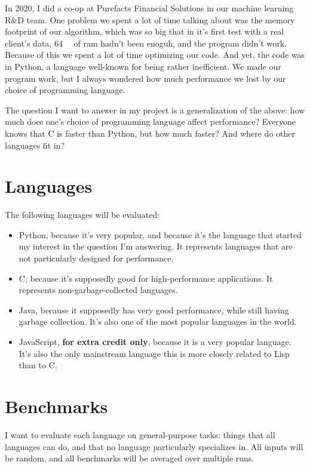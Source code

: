 \documentclass[12pt,letterpaper]{article}
\begin{document}
In 2020, I did a co-op at Purefacts Financial Solutions in our machine learning
R\&D team. One problem we spent a lot of time talking about was the memory
footprint of our algorithm, which was so big that in it's first test with a real
client's data, \SI{64}{\giga\byte} of ram hadn't been enoguh, and the program
didn't work. Because of this we spent a lot of time optimizing our code. And
yet, the code was in Python, a language well-known for being rather inefficient.
We made our program work, but I always wondered how much performance we lost by
our choice of programming language.

The question I want to answer in my project is a generalization of the above:
how much does one's choice of programming language affect performance? Everyone
knows that C is faster than Python, but how much faster? And where do other
languages fit in?

\section{Languages}

The following languages will be evaluated:

\begin{itemize}
	\item Python, because it's very popular, and because it's the language that
		started my interest in the question I'm answering. It represents languages
		that are not particularly designed for performance.
	\item C, because it's supposedly good for high-performance applications. It
		represents non-garbage-collected languages.
	\item Java, because it supposedly has very good performance, while still
		having garbage collection. It's also one of the most popular languages in
		the world.
	\item JavaScript, \textbf{for extra credit only}, because it is a very popular
		language. It's also the only mainstream language this is more closely
		related to Lisp than to C.
\end{itemize}


\section{Benchmarks}

I want to evaluate each language on general-purpose tasks: things that all
languages can do, and that no language particularly specializes in. All inputs
will be random, and all benchmarks will be averaged over multiple runs.
\end{document}
